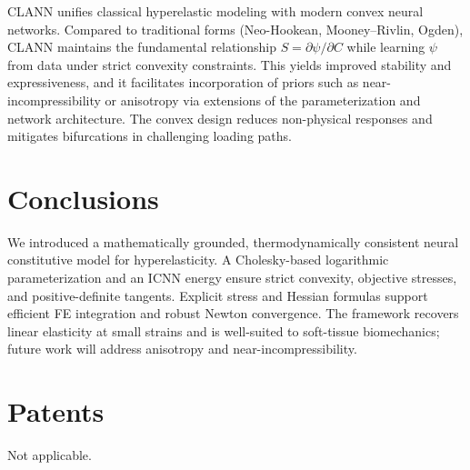 \documentclass[journal,article,submit,pdftex,moreauthors]{Definitions/mdpi}
\begin{document}
CLANN unifies classical hyperelastic modeling with modern convex neural networks. Compared to traditional forms (Neo-Hookean, Mooney--Rivlin, Ogden), CLANN maintains the fundamental relationship \(S=\partial\psi/\partial C\) while learning \(\psi\) from data under strict convexity constraints. This yields improved stability and expressiveness, and it facilitates incorporation of priors such as near-incompressibility or anisotropy via extensions of the parameterization and network architecture. The convex design reduces non-physical responses and mitigates bifurcations in challenging loading paths.

\section{Conclusions}

We introduced a mathematically grounded, thermodynamically consistent neural constitutive model for hyperelasticity. A Cholesky-based logarithmic parameterization and an ICNN energy ensure strict convexity, objective stresses, and positive-definite tangents. Explicit stress and Hessian formulas support efficient FE integration and robust Newton convergence. The framework recovers linear elasticity at small strains and is well-suited to soft-tissue biomechanics; future work will address anisotropy and near-incompressibility.

\section{Patents}

Not applicable.

\vspace{6pt} 



\end{document}
